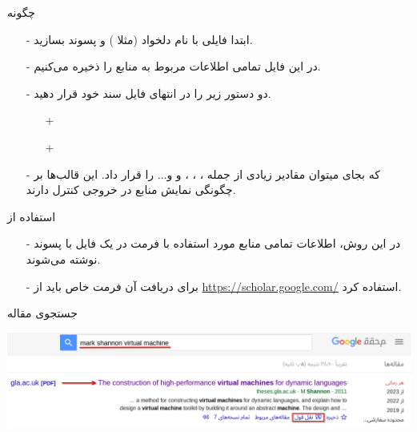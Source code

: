 \begin{frame}{چگونه}
\begin{itemize}\itemr
\item[-]
ابتدا فایلی با نام دلخواد (مثلا ) و پسوند  بسازید.

\item[-]
در این فایل تمامی اطلاعات مربوط به منابع را ذخیره می‌کنیم.

\item[-]
دو دستور زیر را در انتهای فایل سند خود قرار دهید.
\begin{itemize}\itemr
\item[+] 
\item[+] 
\end{itemize}
\item[-]
که بجای 
میتوان مقادیر زیادی از جمله
،
،
،
 و
و...
را قرار داد. این قالب‌ها بر چگونگی نمایش منابع در خروجی کنترل دارند.
\end{itemize}
\end{frame}

\begin{frame}{استفاده از }
\begin{itemize}\itemr
\item[-]
در این روش، اطلاعات تمامی منابع مورد استفاده با فرمت 
در یک فایل با پسوند  نوشته می‌شوند.

\item[-]
برای دریافت آن فرمت خاص باید از 
\url{https://scholar.google.com/}
استفاده کرد.
\end{itemize}
\end{frame}

\begin{frame}{جستجوی مقاله}
\begin{center}
\includegraphics[width=\textwidth]{docs/images/search}
\end{center}
\end{frame}

